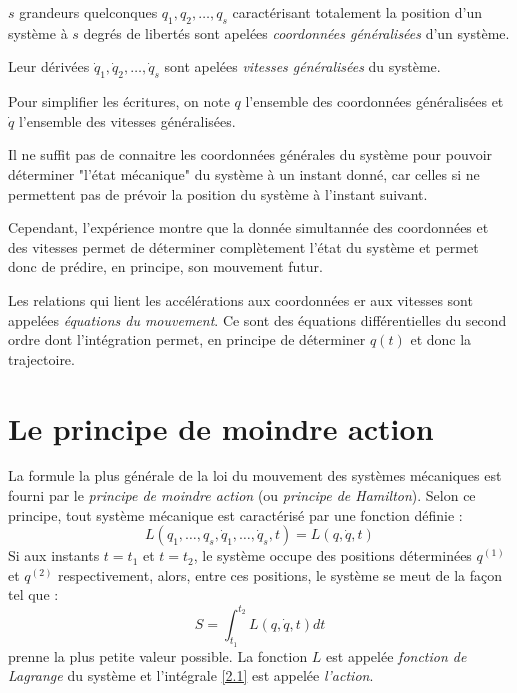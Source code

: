\begin{definition}
    \(s\) grandeurs quelconques \(q_{1},q_{2},\dots,q_{s}\) caractérisant totalement la position d'un système à \(s\) degrés de libertés sont apelées \textit{coordonnées généralisées} d'un système. \par
    Leur dérivées \(\dot{q}_{1}, \dot{q}_{2}, \dots, \dot{q}_{s}\) sont apelées \textit{vitesses généralisées} du système. 
\end{definition}

\begin{notation}
    Pour simplifier les écritures, on note \(q\) l'ensemble des coordonnées généralisées et \(\dot{q}\) l'ensemble des vitesses généralisées. 
\end{notation}

\begin{theorem}
    Il ne suffit pas de connaitre les coordonnées générales du système pour pouvoir déterminer "l'état mécanique" du système à un instant donné, car celles si ne permettent pas de prévoir la position du système à l'instant suivant. \par
    Cependant, l'expérience montre que la donnée simultannée des coordonnées et des vitesses permet de déterminer complètement l'état du système et permet donc de prédire, en principe, son mouvement futur.\par
    Les relations qui lient les accélérations aux coordonnées er aux vitesses sont appelées \textit{équations du mouvement}. Ce sont des équations différentielles du second ordre dont l'intégration permet, en principe de déterminer \(q(t)\) et donc la trajectoire.
\end{theorem}

\section{Le principe de moindre action}

\begin{theorem}
    La formule la plus générale de la loi du mouvement des systèmes mécaniques est fourni par le \textit{principe de moindre action} (ou \textit{principe de Hamilton}). Selon ce principe, tout système mécanique est caractérisé par une fonction définie : 
    \[
        L(q_{1},\dots,q_{s}, \dot{q}_{1},\dots,\dot{q}_{s},t) = L(q,\dot{q},t)
    \] 
    Si aux instants \(t = t_{1}\) et \(t = t_{2}\), le système occupe des positions déterminées \(q^{(1)}\) et \(q^{(2)}\) respectivement, alors, entre ces positions, le système se meut de la façon tel que : 
    \begin{equation}\label{2.1}
        S = \int_{t_{1}}^{t_{2}} L(q,\dot{q},t)  dt
    \end{equation}   
    prenne la plus petite valeur possible. La fonction \(L\) est appelée \textit{fonction de Lagrange} du système et l'intégrale \autoref{2.1} est appelée \textit{l'action}. 
\end{theorem}

